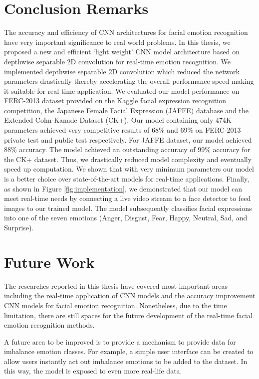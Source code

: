 \documentclass[master]{thesis-uestc}
\begin{document}
\section{Conclusion Remarks}
The accuracy and efficiency of CNN architectures for facial emotion recognition have very important significance to real world problems. In this thesis, we proposed a new and efficient `light weight' CNN model architecture based on depthwise separable 2D convolution for real-time emotion recognition. We implemented depthwise separable 2D convolution which reduced the network parameters drastically thereby accelerating the overall performance speed making it suitable for real-time application. We evaluated our model performance on FERC-2013 dataset provided on the Kaggle facial expression recognition competition, the Japanese Female Facial Expression (JAFFE) database and the Extended Cohn-Kanade Dataset (CK+). Our model containing only 474K parameters achieved very competitive results of 68\% and 69\% on FERC-2013 private test and public test respectively. For JAFFE dataset, our model achieved 88\% accuracy. The model achieved an outstanding accuracy of 99\% accuracy for the CK+ dataset. Thus, we drastically reduced model complexity and eventually speed up computation. We shown that with very minimum parameters our model is a better choice over state-of-the-art models for real-time applications. Finally, as shown in Figure \ref{fig:implementation}, we demonstrated that our model can meet real-time needs by connecting a live video stream to a face detector to feed images to our trained model. The model subsequently classifies facial expressions into one of the seven emotions (Anger, Disgust, Fear, Happy, Neutral, Sad, and Surprise).

\section{Future Work}
The researches reported in this thesis have covered most important areas including the real-time application of CNN models and the accuracy improvement CNN models for facial emotion recognition. Nonetheless, due to the time limitation, there are still spaces for the future development of the real-time facial emotion recognition methods. 

A future area to be improved is to provide a mechanism to provide data for imbalance emotion classes. For example, a simple user interface can be created to allow users instantly act out imbalance emotions to be added to the dataset. In this way, the model is exposed to even more real-life data.
\end{document}
